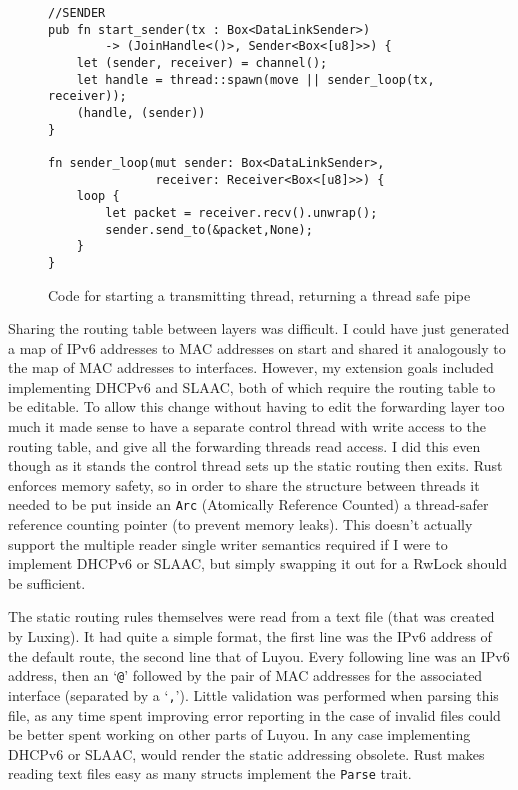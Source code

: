 \documentclass[12pt,a4paper,twoside,openright]{report}
\begin{document}
\begin{figure}
\centering
\begin{varwidth}{\linewidth}
\begin{verbatim}
//SENDER
pub fn start_sender(tx : Box<DataLinkSender>) 
 		-> (JoinHandle<()>, Sender<Box<[u8]>>) {
    let (sender, receiver) = channel();
    let handle = thread::spawn(move || sender_loop(tx, receiver));
    (handle, (sender))
}

fn sender_loop(mut sender: Box<DataLinkSender>, 
			   receiver: Receiver<Box<[u8]>>) {
    loop {
        let packet = receiver.recv().unwrap();
        sender.send_to(&packet,None);
    }
}
\end{verbatim}
\end{varwidth}
\caption{Code for starting a transmitting thread, returning a thread safe pipe}
\label{fig::sending}
\end{figure}

\bigskip

Sharing the routing table between layers was difficult.  I could have just generated a map of IPv6 addresses to MAC addresses on start and shared it analogously to the map of MAC addresses to interfaces. However, my extension goals included implementing DHCPv6 and SLAAC, both of which require the routing table to be editable.  To allow this change without having to edit the forwarding layer too much it made sense to have a separate control thread with write access to the routing table, and give all the forwarding threads read access.  I did this even though as it stands the control thread sets up the static routing then exits.  Rust enforces memory safety, so in order to share the structure between threads it needed to be put inside an \verb!Arc! (Atomically Reference Counted)\cite{rust_arc} a thread-safer reference counting pointer (to prevent memory leaks).  This doesn't actually support the multiple reader single writer semantics required if I were to implement DHCPv6 or SLAAC, but simply swapping it out for a RwLock\cite{rust_rwlock} should be sufficient.

\bigskip

The static routing rules themselves were read from a text file (that was created by Luxing). It had quite a simple format, the first line was the IPv6 address of the default route, the second line that of Luyou.  Every following line was an IPv6 address, then an `\verb!@!' followed by the pair of MAC addresses for the associated interface (separated by a `\verb!,!').  Little validation was performed when parsing this file, as any time spent improving error reporting in the case of invalid files could be better spent working on other parts of Luyou.  In any case implementing DHCPv6 or SLAAC, would render the static addressing obsolete. Rust makes reading text files easy as many structs implement the \verb!Parse! trait.
\end{document}

